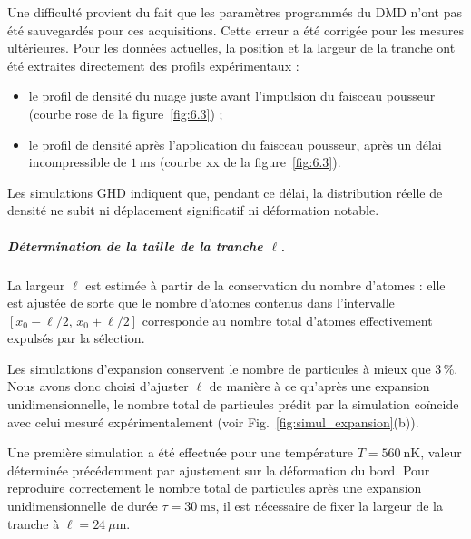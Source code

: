 Une difficulté provient du fait que les paramètres programmés du \gls*{DMD} n’ont pas été sauvegardés pour ces acquisitions. Cette erreur a été corrigée pour les mesures ultérieures. Pour les données actuelles, la position et la largeur de la tranche ont été extraites directement des profils expérimentaux :  

\begin{itemize}[label=$\bullet$]
    \item le profil de densité du nuage juste avant l’impulsion du faisceau pousseur (courbe rose de la figure~\ref{fig:6.3}) ;
    \item le profil de densité après l’application du faisceau pousseur, après un délai incompressible de $1~\mathrm{ms}$ (courbe xx de la figure~\ref{fig:6.3}).
\end{itemize}

Les simulations \gls*{GHD} indiquent que, pendant ce délai, la distribution réelle de densité ne subit ni déplacement significatif ni déformation notable. %

\subparagraph{Détermination de la taille de la tranche \(\ell\).}

La largeur \(\ell\) est estimée à partir de la conservation du nombre d’atomes : elle est ajustée de sorte que le nombre d’atomes contenus dans l’intervalle \([x_0-\ell/2,\,x_0+\ell/2]\) corresponde au nombre total d’atomes effectivement expulsés par la sélection.

\medskip

Les simulations d’expansion conservent le nombre de particules à mieux que \(3\,\%\). Nous avons donc choisi d’ajuster \(\ell\) de manière à ce qu’après une expansion unidimensionnelle, le nombre total de particules prédit par la simulation coïncide avec celui mesuré expérimentalement (voir Fig.~\ref{fig:simul_expansion}(b)).

\medskip

Une première simulation a été effectuée pour une température \(T = 560~\mathrm{nK}\), valeur déterminée précédemment par ajustement sur la déformation du bord.  
Pour reproduire correctement le nombre total de particules après une expansion unidimensionnelle de durée \(\tau = 30~\mathrm{ms}\), il est nécessaire de fixer la largeur de la tranche à \(\ell = 24~\mu\mathrm{m}\).
 





